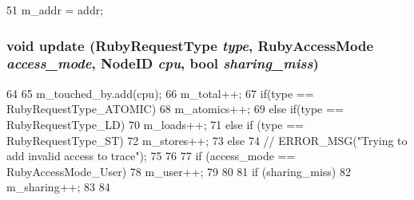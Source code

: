 \begin{DoxyCode}
51 { m_addr = addr; }
\end{DoxyCode}
\hypertarget{classAccessTraceForAddress_a6ef5b8f5316bc299293f80e66d246a34}{
\subsubsection[{update}]{\setlength{\rightskip}{0pt plus 5cm}void update (RubyRequestType {\em type}, \/  RubyAccessMode {\em access\_\-mode}, \/  {\bf NodeID} {\em cpu}, \/  bool {\em sharing\_\-miss})}}
\label{classAccessTraceForAddress_a6ef5b8f5316bc299293f80e66d246a34}



\begin{DoxyCode}
64 {
65     m_touched_by.add(cpu);
66     m_total++;
67     if(type == RubyRequestType_ATOMIC) {
68         m_atomics++;
69     } else if(type == RubyRequestType_LD){
70         m_loads++;
71     } else if (type == RubyRequestType_ST){
72         m_stores++;
73     } else {
74         //  ERROR_MSG("Trying to add invalid access to trace");
75     }
76 
77     if (access_mode == RubyAccessMode_User) {
78         m_user++;
79     }
80 
81     if (sharing_miss) {
82         m_sharing++;
83     }
84 }
\end{DoxyCode}



